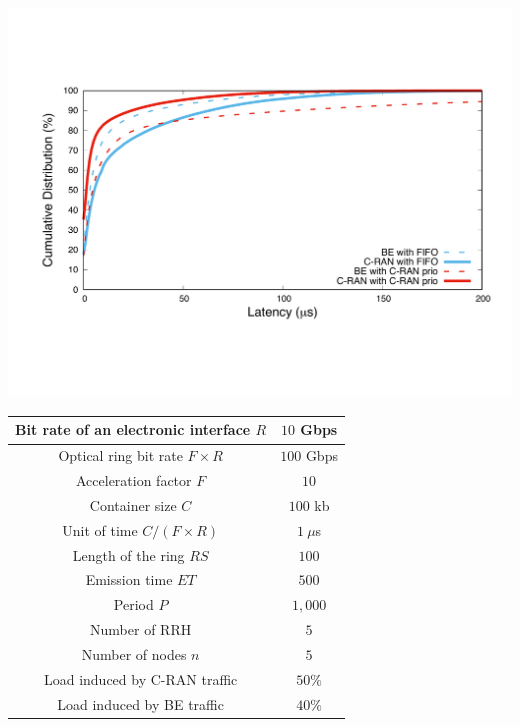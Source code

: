 \documentclass[]{llncs}
\begin{document}
   \vspace{0.5cm}
  \hspace{-0.75cm}
    \begin{minipage}[b]{0.50\linewidth}


        \begin{center}
      \includegraphics[scale=0.3]{opport.pdf}

         \label{fig:resultopport}
      \end{center} 
  \end{minipage}
\hfill
  \begin{minipage}[b]{0.40\linewidth}
 
  \scalebox{0.65}
  {
 
  \centering
  \begin{tabular}{|c|c|}
  \hline
  Bit rate of an electronic interface $R$ & $10$ Gbps \tabularnewline
  \hline
  Optical ring bit rate $F\times R$ & $100$ Gbps \tabularnewline
  \hline
    Acceleration factor $F$ & $10$  \tabularnewline
  \hline
  Container size  $C$ & $100$ kb  \tabularnewline
  \hline
  Unit of time $C/(F\times R)$ & $1~\mu$s \tabularnewline
  \hline
  Length of the ring $RS$ & $100$ \tabularnewline
  \hline
  Emission time $ET$ & $500$ \tabularnewline
  \hline
   Period $P$ & $1,000$ \tabularnewline
  \hline
  Number of RRH & $5$  \tabularnewline
  \hline
  Number of nodes $n$ & $5$  \tabularnewline
  \hline
   Load induced by C-RAN traffic & $50\%$  \tabularnewline
  \hline
    Load induced by BE traffic & $40\%$  \tabularnewline
  \hline
  \end{tabular}
  }

  \label{fig:params}

  \end{minipage} 
  
\end{document}
